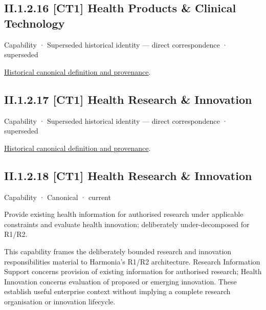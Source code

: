 \subsection*{II.1.2.16 [CT1] Health Products \& Clinical Technology}
\label{navigation:II.1.2.16}

\label{element:a631a8600b8b49df9ef452c48c91349a}
{\small Capability · Superseded historical identity — direct correspondence · superseded}\par
\href{../../../../continuum/strategy/capability/a631a8600b8b49df9ef452c48c91349a.md}{Historical canonical definition and provenance}.\par
\subsection*{II.1.2.17 [CT1] Health Research \& Innovation}
\label{navigation:II.1.2.17}

\label{element:2cc31384c8864c73989025cbe96dcfa7}
{\small Capability · Superseded historical identity — direct correspondence · superseded}\par
\href{../../../../continuum/strategy/capability/2cc31384c8864c73989025cbe96dcfa7.md}{Historical canonical definition and provenance}.\par
\subsection*{II.1.2.18 [CT1] Health Research \& Innovation}
\label{navigation:II.1.2.18}

\label{element:582bf62145fd42118e5d57bb714841e8}
{\small Capability · Canonical · current}\par

Provide existing health information for authorised research under applicable constraints and evaluate health innovation; deliberately under-decomposed for R1/R2.



This capability frames the deliberately bounded research and innovation responsibilities material to Harmonia's R1/R2 architecture. Research Information Support concerns provision of existing information for authorised research; Health Innovation concerns evaluation of proposed or emerging innovation. These establish useful enterprise context without implying a complete research organisation or innovation lifecycle.



